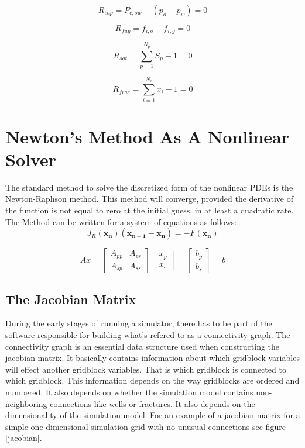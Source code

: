 \begin{equation}
	R_{cap} = P_{c,ow} - (p_{o} - p_{w}) = 0
\end{equation}

\begin{equation}
	R_{fug} = f_{i,o} - f_{i,g} = 0
\end{equation}

\begin{equation}
	R_{sat} = \sum_{p=1}^{N_{p}}S_{p} - 1 = 0
\end{equation}

\begin{equation}
	R_{frac} = \sum_{i=1}^{N_{c}}x_{i} - 1 = 0
\end{equation}

\section{Newton's Method As A Nonlinear Solver}
The standard method to solve the discretized form of the nonlinear PDEs is the Newton-Raphson method. This method 
will converge, provided the derivative of the function is not equal to zero at the initial guess, in at least
a quadratic rate. The Method can be written for a system of equations as follows:
\begin{equation}
J_{R}(\mathbf{x_{n}})(\mathbf{x_{n+1} - x_{n}}) = -F(\mathbf{x_{n}})
\end{equation}

\begin{equation}
	Ax = 
\begin{bmatrix}
	A_{pp} & A_{ps}\\
	A_{sp} & A_{ss}
\end{bmatrix}
\begin{bmatrix}
	x_{p} \\
	x_{s}
\end{bmatrix}
=
\begin{bmatrix}
	b_{p} \\
	b_{s}
\end{bmatrix}
=
b
\end{equation}

\subsection{The Jacobian Matrix}
During the early stages of running a simulator, there has to be part of the software responsible for
building what's refered to as a connectivity graph. The connectivity graph is an essential data structure used
when constructing the jacobian matrix. It basically contains information about which gridblock variables will effect
another gridblock variables. That is which gridblock is connected to which gridblock. This information depends on the
way gridblocks are ordered and numbered. It also depends on whether the simulation model contains non-neighboring connections
like wells or fractures. It also depends on the dimensionality of the simulation model. For an example of a jacobian matrix for a 
simple one dimensional simulation grid with no unusual connections see figure \ref{jacobian}.

